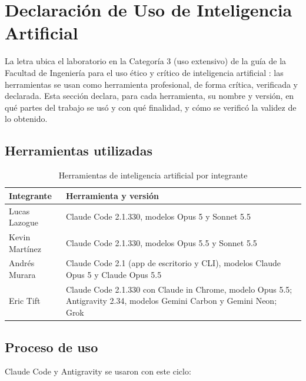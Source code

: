 \section{Declaración de Uso de Inteligencia Artificial}\label{sec:declaracion-ia}

La letra ubica el laboratorio en la Categoría 3 (uso extensivo) de la guía de la Facultad de Ingeniería para el uso ético y crítico de inteligencia artificial \cite{LINS2026}\cite{FING2026}: las herramientas se usan como herramienta profesional, de forma crítica, verificada y declarada. Esta sección declara, para cada herramienta, su nombre y versión, en qué partes del trabajo se usó y con qué finalidad, y cómo se verificó la validez de lo obtenido.

\subsection{Herramientas utilizadas}

\begin{table}[H]
    \small
    \centering
    \caption{Herramientas de inteligencia artificial por integrante}
    \label{tab:herramientas-ia}
    \begin{tabular}{|p{4.1cm}|p{11.7cm}|}
        \hline
            \textbf{Integrante} & \textbf{Herramienta y versión} \\
        \hline
            Lucas Lazogue & Claude Code 2.1.330, modelos Opus 5 y Sonnet 5.5 \\
        \hline
            Kevin Martínez & Claude Code 2.1.330, modelos Opus 5.5 y Sonnet 5.5 \\
        \hline
            Andrés Murara & Claude Code 2.1 (app de escritorio y CLI), modelos Claude Opus 5 y Claude Opus 5.5 \\
        \hline
            Eric Tift & Claude Code 2.1.330 con Claude in Chrome, modelo Opus 5.5; Antigravity 2.34, modelos Gemini Carbon y Gemini Neon; Grok \\
        \hline
    \end{tabular}
\end{table}

\subsection{Proceso de uso}

Claude Code y Antigravity se usaron con este ciclo:

